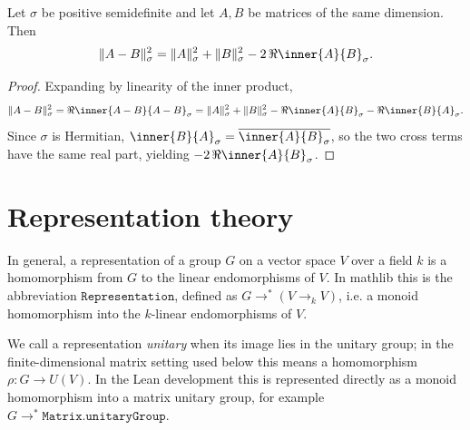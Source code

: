 \begin{proposition}\label{sigmaNormSqSub}\leanok
Let $\sigma$ be positive semidefinite and let $A, B$ be matrices of the same dimension. Then
\[
\|A - B\|_\sigma^2 = \|A\|_\sigma^2 + \|B\|_\sigma^2 - 2\,\Re\inner{A}{B}_\sigma.
\]
\end{proposition}
\begin{proof}\leanok
    Expanding by linearity of the inner product,
    \[
    \|A-B\|_\sigma^2 = \Re\inner{A-B}{A-B}_\sigma
    = \|A\|_\sigma^2 + \|B\|_\sigma^2 - \Re\inner{A}{B}_\sigma - \Re\inner{B}{A}_\sigma.
    \]
    Since $\sigma$ is Hermitian, $\inner{B}{A}_\sigma = \overline{\inner{A}{B}_\sigma}$, so the two cross terms have the same real part, yielding $-2\,\Re\inner{A}{B}_\sigma$.
\end{proof}


\section{Representation theory}



In general, a representation of a group \(G\) on a vector space \(V\) over a
field \(k\) is a homomorphism from \(G\) to the linear endomorphisms of \(V\).
In mathlib this is the abbreviation \(\texttt{Representation}\), defined as
\(G \to^* (V \to_{\!k} V)\), i.e. a monoid homomorphism into the \(k\)-linear
endomorphisms of \(V\).

We call a representation \emph{unitary} when its image lies in the unitary
group; in the finite-dimensional matrix setting used below this means a
homomorphism \(\rho : G \to U(V)\). In the Lean development this is represented
directly as a monoid homomorphism into a matrix unitary group, for example
\(G \to^* \texttt{Matrix.unitaryGroup}\).


